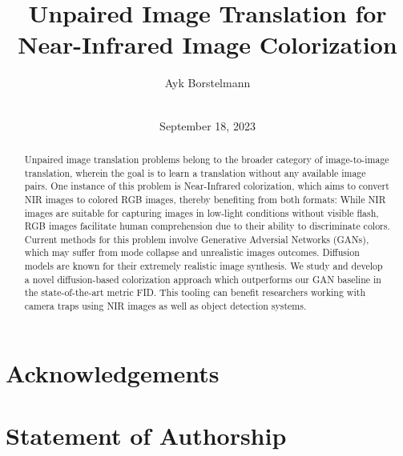 \documentclass[ba,logo]{ivs-thesis}
\title{Unpaired Image Translation for Near-Infrared Image Colorization}
\author{Ayk Borstelmann\\\birthinfo{March 28, 2002 in Aschaffenburg}\\\matricnumber{3441004}}
\date{September 18, 2023}
\begin{document}
\frontmatter

\maketitle

\cleardoublepage
\begin{abstract}
	Unpaired image translation problems belong to the broader category of image-to-image translation, 
	wherein the goal is to learn a translation without any available image pairs. 
	One instance of this problem is Near-Infrared colorization, which aims to convert NIR images to colored RGB images,
	thereby benefiting from both formats:
	While NIR images are suitable for capturing images in low-light conditions without visible flash, 
	RGB images facilitate human comprehension due to their ability to discriminate colors. 
	Current methods for this problem involve Generative Adversial Networks (GANs), 
	which may suffer from mode collapse and unrealistic images outcomes. 
	Diffusion models are known for their extremely realistic image synthesis. 
	We study and develop a novel diffusion-based colorization approach which outperforms our GAN baseline in the state-of-the-art metric FID. 
	This tooling can benefit researchers working with camera traps using NIR images as well as object detection systems.
\end{abstract}

\chapter*{Acknowledgements}

\cleardoublepage
\chapter*{Statement of Authorship}

% 

\cleardoublepage
\tableofcontents


\mainmatter
\end{document}
